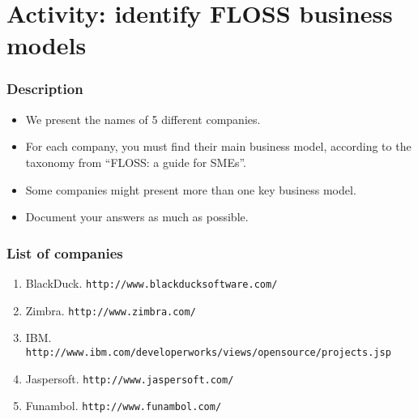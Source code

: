
\section{Activity: identify FLOSS business models}

\begin{frame}
\frametitle{Description}
\begin{itemize}
  \item We present the names of 5 different companies.
  \item For each company, you must find their main business model, according
to the taxonomy from ``FLOSS: a guide for SMEs''.
  \item Some companies might present more than one key business model.
  \item Document your answers as much as possible.
\end{itemize}
\end{frame}

\begin{frame}
 \frametitle{List of companies}
  \begin{enumerate}
   \item BlackDuck.
   \texttt{http://www.blackducksoftware.com/}
   \item Zimbra.
   \texttt{http://www.zimbra.com/}
   \item IBM.
   \texttt{\footnotesize{http://www.ibm.com/developerworks/views/opensource/projects.jsp}}
   \item Jaspersoft.
   \texttt{http://www.jaspersoft.com/}
   \item Funambol.
   \texttt{http://www.funambol.com/}
  \end{enumerate}

\end{frame}


